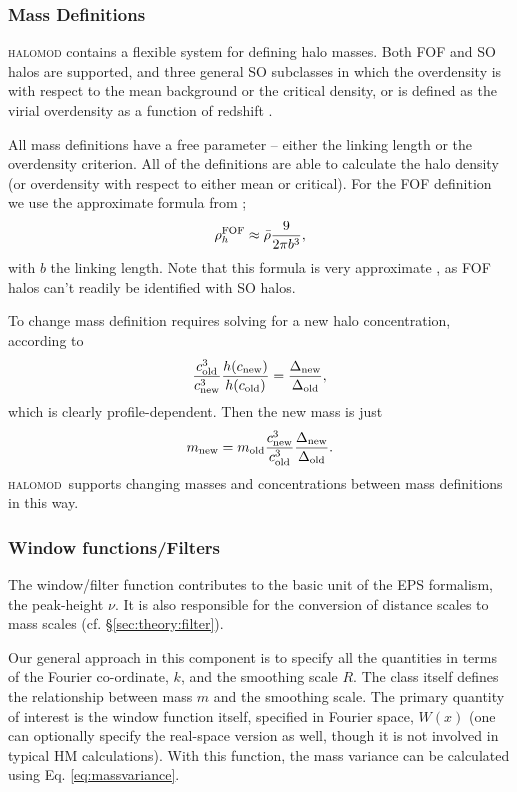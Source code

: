 \documentclass[5p]{elsarticle}
\newcommand{\halomod}{\textsc{halomod}}
\begin{document}
\subsubsection{Mass Definitions}
\label{sec:halomod:components:mass-def}
\textsc{halomod} contains a flexible system for defining halo masses. 
Both FOF and SO halos are supported, and three general SO subclasses in which the overdensity is with respect to the mean background or the critical density, or is defined as the virial overdensity as a function of redshift \citep{Bryan1998}. 

All mass definitions have a free parameter -- either the linking length or the overdensity criterion. All of the definitions are able to calculate the halo density (or overdensity with respect to either mean or critical). For the FOF definition we use the approximate formula from \cite{White2001};
\begin{equation}
    \rho_h^{\rm FOF} \approx \bar{\rho} \frac{9}{2\pi b^3},
\end{equation}
with $b$ the linking length. Note that this formula is very approximate \citep{More2011}, as FOF halos can't readily be identified with SO halos. 

To change mass definition requires solving for a new halo concentration, according to
\begin{equation}
    \frac{c_{\rm old}^3}{c_{\rm new}^3} \frac{h(c_{\rm new})}{h(c_{\rm old})} = \frac{\Delta_{\rm new}}{\Delta_{\rm old}},
\end{equation}
which is clearly profile-dependent. Then the new mass is just
\begin{equation}
    m_{\rm new} = m_{\rm old} \frac{c_{\rm new}^3}{c_{\rm old}^3} \frac{\Delta_{\rm new}}{\Delta_{\rm old}}.
\end{equation}
\halomod\  supports changing masses and concentrations between mass definitions in this way. 


\subsubsection{Window functions/Filters}
\label{sec:halomod:components:window}
The window/filter function contributes to the basic unit of the EPS formalism, the peak-height $\nu$. It is also responsible for the conversion of distance scales to mass scales (cf. \S\ref{sec:theory:filter}).

Our general approach in this component is to specify all the quantities in terms of the Fourier co-ordinate, $k$, and the smoothing scale $R$. The class itself defines the relationship between mass $m$ and the smoothing scale. The primary quantity of interest is the window function itself, specified in Fourier space, $W(x)$ (one can optionally specify the real-space version as well, though it is not involved in typical HM calculations). With this function, the mass variance can be calculated using Eq. \ref{eq:massvariance}. 
\end{document}
